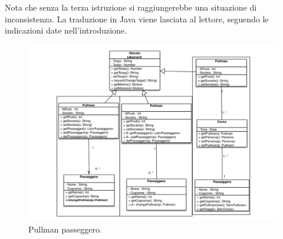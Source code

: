 \documentclass{article}
\begin{document}
Nota che senza la terza istruzione si raggiungerebbe una situazione di inconsistenza. La traduzione in Java viene lasciata al lettore, seguendo le indicazioni date nell'introduzione.

\begin{figure}[h!]
  \centering
    \includegraphics[width=1\textwidth]{Img/pullmanpasseggero.pdf}
      \caption{Pullman passeggero.}
      \label{Fig:pullmanPasseggero}
\end{figure}

\clearpage
\end{document}

